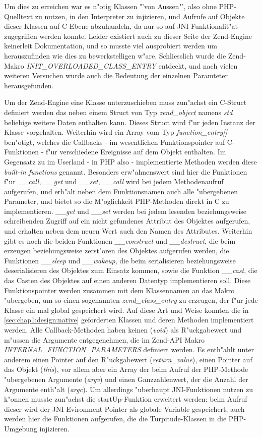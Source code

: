 Um dies zu erreichen war es n"otig Klassen "'von Aussen"', also ohne PHP-Quelltext zu nutzen, in den Interpreter zu injizieren,
und Aufrufe auf Objekte dieser Klassen auf C-Ebene abzuhandeln, da nur so auf JNI-Funktionalit"at zugegriffen werden konnte. 
Leider existiert auch zu dieser Seite der Zend-Engine keinerleit Dokumentation, und so musste viel ausprobiert werden um
herauszufinden wie dies zu bewerkstelligen w"are. Schliesslich wurde die Zend-Makro \emph{INIT\_OVERLOADED\_CLASS\_ENTRY} entdeckt,
und nach vielen weiteren Versuchen wurde auch die Bedeutung der einzelnen Paramteter herausgefunden.

Um der Zend-Engine eine Klasse unterzuschieben muss zun"achst ein C-Struct definiert werden das neben einem Struct von Typ
\emph{zend\_object} namens \emph{std} beliebige weitere Daten enthalten kann. Dieses Struct wird f"ur jeden Instanz der Klasse
vorgehalten. Weiterhin wird ein Array vom Typ \emph{function\_entry[]} ben"otigt, welches die Callbacks - im wesentlichen Funktionspointer
auf C-Funktionen - f"ur verschiedene Ereignisse auf dem Objekt enthalten. Im Gegensatz zu im Userland - in PHP also - implementierte
Methoden werden diese \emph{built-in functions} genannt.
Besonders erw"ahnenswert sind hier die Funktionen f"ur 
\emph{\_\_call}, \emph{\_\_get} und \emph{\_\_set}, \emph{\_\_call} wird bei jedem Methodenaufruf aufgerufen, und erh"alt neben dem
Funktionsnamen auch alle "ubergebenen Parameter, und bietet so die M"oglichkeit PHP-Methoden direkt in C zu implementieren. 
\emph{\_\_get} und \emph{\_\_set} werden bei jedem lesenden beziehungsweise schreibenden Zugriff auf ein nicht gefundenes Attribut des
Objektes aufgerufen, und erhalten neben dem neuen Wert auch den Namen des Attributes. Weiterhin gibt es noch die beiden Funktionen
\emph{\_\_construct} und \emph{\_\_destruct}, die beim erzeugen beziehungsweise zerst"oren des Objektes aufgerufen werden,
die Funktionen \emph{\_\_sleep} und \emph{\_\_wakeup}, die beim serialisieren beziehungsweise deserialisieren des Objektes zum
Einsatz kommen, sowie die Funktion \emph{\_\_cast}, die das Casten des Objektes auf einen anderen Datentyp implementieren soll.
Diese Funktionspointer werden zusammen mit dem Klassennamen an das Makro "ubergeben, um so einen sogenannten \emph{zend\_class\_entry}
zu erzeugen, der f"ur jede Klasse ein mal global gespeichert wird.
Auf diese Art und Weise konnten die in 
\ref{sec:chap1:design:native} geforderten Klassen und deren Methoden implementiert werden. Alle Callback-Methoden haben keinen (\emph{void})
als R"uckgabewert und m"ussen die Argumente entgegenehmen, die im Zend-API Makro \emph{INTERNAL\_FUNCTION\_PARAMETERS} definiert werden.
Es enth"ahlt unter anderem einen Pointer auf den R"uckgabewert (\emph{return\_value}), einen Pointer auf das Objekt (\emph{this}), vor
allem aber ein Array der beim Aufruf der PHP-Methode "ubergebenen Argumente (\emph{argv}) und einen Ganzzahlenwert, der die Anzahl
der Argumente enth"alt (\emph{argc}).
Um allerdings "uberhaupt JNI-Funktionen nutzen zu k"onnen musste zun"achst die startUp-Funktion erweitert werden: beim Aufruf dieser
wird der JNI-Evironment Pointer als globale Variable gespeichert, auch werden hier die Funktionen aufgerufen, die die Turpitude-Klassen
in die PHP-Umgebung injizieren.

